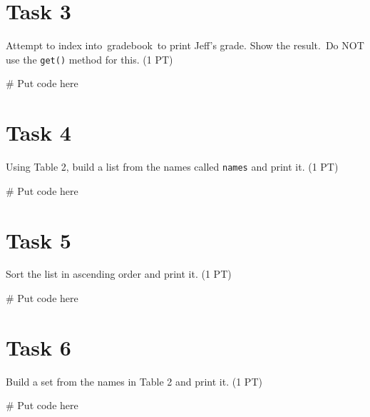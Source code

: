 \documentclass[
  letterpaper,
  DIV=11,
  numbers=noendperiod]{scrreprt}
\newenvironment{Shaded}{\begin{snugshade}}{\end{snugshade}}
\newcommand{\CommentTok}[1]{\textcolor[rgb]{0.37,0.37,0.37}{#1}}
\begin{document}
\hypertarget{task-3}{%
\section{Task 3}\label{task-3}}

Attempt to index into~gradebook~to print Jeff's grade. Show the
result.~Do NOT use the \texttt{get()} method for this. (1 PT)

\begin{Shaded}
\begin{Highlighting}[]
\CommentTok{\# Put code here}
\end{Highlighting}
\end{Shaded}

\hypertarget{task-4}{%
\section{Task 4}\label{task-4}}

Using Table 2, build a list from the names called \texttt{names} and
print it. (1 PT)

\begin{Shaded}
\begin{Highlighting}[]
\CommentTok{\# Put code here}
\end{Highlighting}
\end{Shaded}

\hypertarget{task-5}{%
\section{Task 5}\label{task-5}}

Sort the list in ascending order and print it. (1 PT)

\begin{Shaded}
\begin{Highlighting}[]
\CommentTok{\# Put code here}
\end{Highlighting}
\end{Shaded}

\hypertarget{task-6}{%
\section{Task 6}\label{task-6}}

Build a set from the names in Table 2 and print it. (1 PT)

\begin{Shaded}
\begin{Highlighting}[]
\CommentTok{\# Put code here}
\end{Highlighting}
\end{Shaded}
\end{document}
